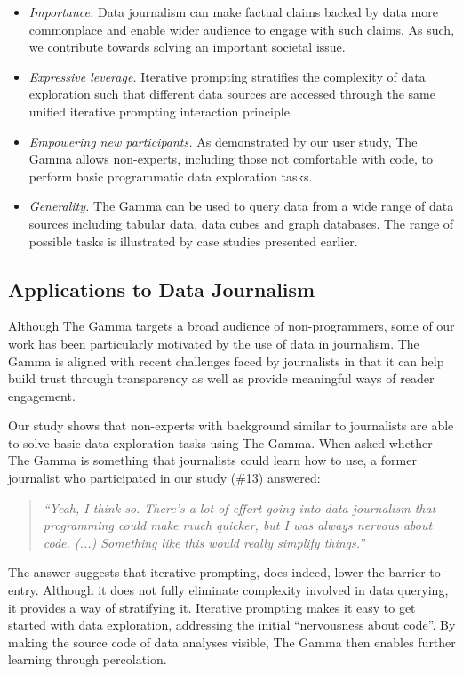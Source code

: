 \documentclass[manuscript,review,anonymous]{acmart}
\begin{document}
\begin{itemize}
\item \emph{Importance.} Data journalism can make factual claims backed by data more commonplace
and enable wider audience to engage with such claims. As such, we contribute towards
solving an important societal issue.

\item \emph{Expressive leverage.} Iterative prompting stratifies the complexity of data exploration
such that different data sources are accessed through the same unified iterative prompting
interaction principle.

\item \emph{Empowering new participants.} As demonstrated by our user study, The Gamma allows
non-experts, including those not comfortable with code, to perform basic programmatic
data exploration tasks.

\item \emph{Generality.} The Gamma can be used to query data from a wide range of data
sources including tabular data, data cubes and graph databases. The range of possible tasks is
illustrated by case studies presented earlier.
\end{itemize}

\subsection{Applications to Data Journalism}
Although The Gamma targets a broad audience of non-programmers, some of our work has been
particularly motivated by the use of data in journalism. The Gamma is aligned with recent challenges
faced by journalists in that it can help build trust through transparency as well as provide
meaningful ways of reader engagement.

Our study shows that non-experts with background similar
to journalists are able to solve basic data exploration tasks using The Gamma. When asked whether
The Gamma is something that journalists could learn how to use, a former journalist who
participated in our study (\#13) answered:

\begin{quote}
\emph{``Yeah, I think so. There's a lot of effort going into data journalism that
  programming could make much quicker, but I was always nervous about code. (...)
  Something like this would really simplify things.''}
\end{quote}

\noindent
The answer suggests that iterative prompting, does indeed, lower the barrier to entry. Although it
does not fully eliminate complexity involved in data querying, it provides a way of stratifying
it. Iterative prompting makes it easy to get started with data exploration, addressing the initial
``nervousness about code''. By making the source code of data analyses visible, The Gamma then
enables further learning through percolation.
\end{document}

